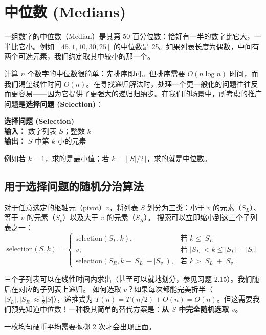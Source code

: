\section{中位数 (Medians)}

一组数字的中位数（Median）是其第 50 百分位数：恰好有一半的数字比它大，一半比它小。例如 $[45, 1, 10, 30, 25]$ 的中位数是 25。如果列表长度为偶数，中间有两个可选元素，我们约定取其中较小的那一个。

计算 $n$ 个数字的中位数很简单：先排序即可。但排序需要 $O(n \log n)$ 时间，而我们渴望线性时间 $O(n)$。在寻找递归解法时，处理一个更一般化的问题往往反而更容易——因为它提供了更强大的递归归纳步。在我们的场景中，所考虑的推广问题是\textbf{选择问题 (Selection)}：

\begin{tcolorbox}[colback=white,colframe=gray!50!black]
\textbf{选择问题 (Selection)} \\
\textbf{输入：} 数字列表 $S$；整数 $k$ \\
\textbf{输出：} $S$ 中第 $k$ 小的元素
\end{tcolorbox}

例如若 $k = 1$，求的是最小值；若 $k = \lfloor |S|/2 \rfloor$，求的就是中位数。

\subsection*{用于选择问题的随机分治算法}
对于任意选定的枢轴元（pivot）$v$，将列表 $S$ 划分为三类：小于 $v$ 的元素（$S_L$）、等于 $v$ 的元素（$S_v$）以及大于 $v$ 的元素（$S_R$）。
搜索可以立即缩小到这三个子列表之一：
\[
\text{selection}(S, k) = \begin{cases}
\text{selection}(S_L, k), & \text{若 } k \le |S_L| \\
v, & \text{若 } |S_L| < k \le |S_L| + |S_v| \\
\text{selection}(S_R, k - |S_L| - |S_v|), & \text{若 } k > |S_L| + |S_v|.
\end{cases}
\]

三个子列表可以在线性时间内求出（甚至可以就地划分，参见习题 2.15）。我们随后在对应的子列表上递归。
如何选取 $v$？如果每次都能完美折半（$|S_L|, |S_R| \approx \frac{1}{2}|S|$），递推式为 $T(n) = T(n/2) + O(n) = O(n)$。但这需要我们预先知道中位数！一种极其简单的替代方案是：\textbf{从 $S$ 中完全随机选取 $v$}。

\begin{lemma}
一枚均匀硬币平均需要抛掷 2 次才会出现正面。
\end{lemma}

